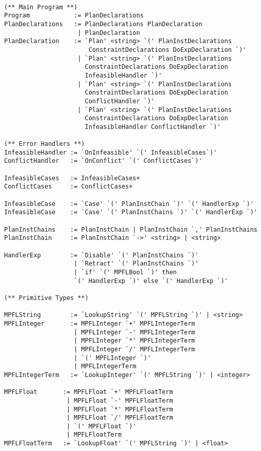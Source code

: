 \begin{verbatim}

(** Main Program **)
Program            := PlanDeclarations
PlanDeclarations   := PlanDeclarations PlanDeclaration 
                    | PlanDeclaration
PlanDeclaration    := `Plan' <string> `(' PlanInstDeclarations 
                       ConstraintDeclarations DoExpDeclaration `)' 
                    | `Plan' <string> `(' PlanInstDeclarations
                      ConstraintDeclarations DoExpDeclaration 
                      InfeasibleHandler `)'
                    | `Plan' <string> `(' PlanInstDeclarations
                      ConstraintDeclarations DoExpDeclaration
                      ConflictHandler `)' 
                    | `Plan' <string> `(' PlanInstDeclarations
                      ConstraintDeclarations DoExpDeclaration
                      InfeasibleHandler ConflictHandler `)'          

(** Error Handlers **)
InfeasibleHandler := `OnInfeasible' `(' InfeasibleCases`)'
ConflictHandler   := `OnConflict' `(' ConflictCases`)' 

InfeasibleCases   := InfeasibleCases+
ConflictCases     := ConflictCases+

InfeasibleCase    := `Case' `(' PlanInstChain `)' `(' HandlerExp `)'
InfeasibleCase    := `Case' `(' PlanInstChains `)' `(' HandlerExp `)'

PlanInstChains    := PlanInstChain | PlanInstChain `,' PlanInstChains
PlanInstChain     := PlanInstChain `->' <string> | <string>

HandlerExp        := `Disable' `(' PlanInstChains `)'
                   | `Retract' `(' PlanInstChains `)'
                   | `if' `(' MPFLBool `)' then 
                   `(' HandlerExp `)' else `(' HandlerExp `)'
                        
(** Primitive Types **)

MPFLString        := `LookupString' `(' MPFLString `)' | <string>
MPFLInteger       := MPFLInteger `+' MPFLIntegerTerm
                   | MPFLInteger `-' MPFLIntegerTerm
                   | MPFLInteger `*' MPFLIntegerTerm
                   | MPFLInteger `/' MPFLIntegerTerm
                   | `(' MPFLInteger `)'
                   | MPFLIntegerTerm
MPFLIntegerTerm   := `LookupInteger' `(' MPFLString `)' | <integer>

MPFLFloat       := MPFLFloat `+' MPFLFloatTerm
                 | MPFLFloat `-' MPFLFloatTerm
                 | MPFLFloat `*' MPFLFloatTerm
                 | MPFLFloat `/' MPFLFloatTerm
                 | `(' MPFLFloat `)'
                 | MPFLFloatTerm
MPFLFloatTerm   := `LookupFloat' `(' MPFLString `)' | <float>


\end{verbatim}

